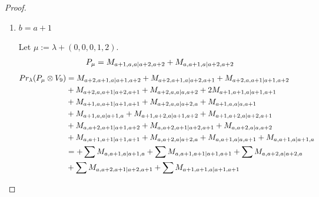 \begin{proof}
\begin{enumerate}
\begin{enumerate}
\begin{table}[htbp]
\begin{tabular}{cc}
{ $M_{b+1,c+1,c|c+1,b+1}$,
 $M_{b+2,c,c+1|c+1,b+2}$,
 $M_{c+1,b+2,c|c+1,b+2}$,
 $M_{b+2,c+1,c|c+1,b+2}$, \\
 $M_{b+1,c,c+2|c+2,b+1}$,
 $M_{c+2,b+1,c|c+2,b+1}$,
 $M_{b+1,c+2,c|c+2,b+1}$,
 $M_{b+2,c,c+2|c+2,b+2}$, \\
 $M_{c+2,b+2,c|c+2,b+2}$,
 $M_{b+2,c+2,c|c+2,b+2}$
}\\
\bottomrule
\end{tabular}
\vspace{0.5em}
\parbox{\linewidth}{\small
\textbf{Interpretation:}
This table displays only selected computational results. This partial presentation does not affect our conclusion.
}
\end{table}


      \item $b=a+1$ \par
        Let $\mu:=\lambda + (0,0,0,1,2) $.
        \begin{equation}\notag
          \begin{aligned}
            P_\mu = M_{a+1,a,a|a+2,a+2}
+ M_{a,a+1,a|a+2,a+2}
          \end{aligned}
        \end{equation}
        \begin{equation}\notag
          \begin{aligned}
            Pr_{\lambda}(P_\mu \otimes V_{9}) &=
M_{a+2,a+1,a|a+1,a+2}
+ M_{a+2,a+1,a|a+2,a+1}
+ M_{a+2,a,a+1|a+1,a+2}\\
                                            &
+ M_{a+2,a,a+1|a+2,a+1}
+ M_{a+2,a,a|a,a+2}
+ 2M_{a+1,a+1,a|a+1,a+1}\\
                                            &
+ M_{a+1,a,a+1|a+1,a+1}
+ M_{a+2,a,a|a+2,a}
+ M_{a+1,a,a|a,a+1}\\
                                            &
+ M_{a+1,a,a|a+1,a}
+ M_{a+1,a+2,a|a+1,a+2}
+ M_{a+1,a+2,a|a+2,a+1}\\
                                            &
+ M_{a,a+2,a+1|a+1,a+2}
+ M_{a,a+2,a+1|a+2,a+1}
+ M_{a,a+2,a|a,a+2}\\
                                            &
+ M_{a,a+1,a+1|a+1,a+1}
+ M_{a,a+2,a|a+2,a}
+ M_{a,a+1,a|a,a+1}
+ M_{a,a+1,a|a+1,a} \\
                                               &=
+\sum M_{a,a+1,a|a+1,a}
 +\sum M_{a,a+1,a+1|a+1,a+1}
 +\sum M_{a,a+2,a|a+2,a}\\
                                            &
 +\sum M_{a,a+2,a+1|a+2,a+1}
 +\sum M_{a+1,a+1,a|a+1,a+1}

\end{aligned}
\end{equation}
\end{enumerate}
\end{enumerate}
\end{proof}

